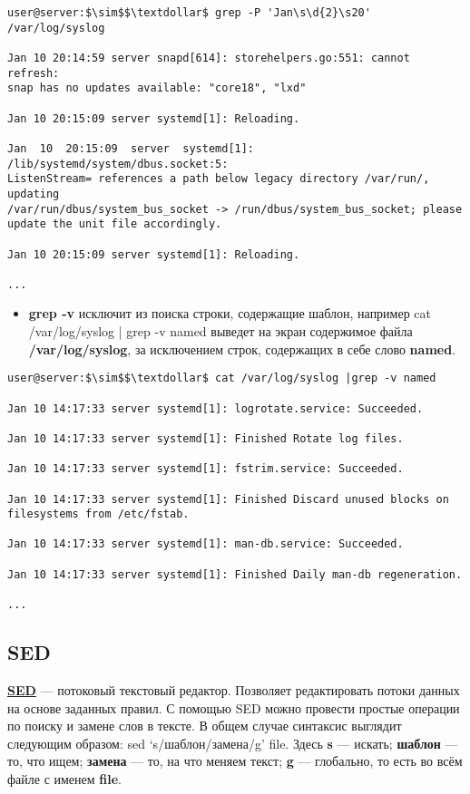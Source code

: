 \documentclass[14pt, a4paper]{article}
\begin{document}
\begin{lstlisting}
user@server:$\sim$$\textdollar$ grep -P 'Jan\s\d{2}\s20' /var/log/syslog

Jan 10 20:14:59 server snapd[614]: storehelpers.go:551: cannot refresh: 
snap has no updates available: "core18", "lxd"

Jan 10 20:15:09 server systemd[1]: Reloading.

Jan  10  20:15:09  server  systemd[1]:  /lib/systemd/system/dbus.socket:5:
ListenStream= references a path below legacy directory /var/run/, updating
/var/run/dbus/system_bus_socket -> /run/dbus/system_bus_socket; please 
update the unit file accordingly.

Jan 10 20:15:09 server systemd[1]: Reloading.

...
\end{lstlisting}

\begin{itemize}
    \item \textbf{grep -v} исключит из поиска строки, содержащие шаблон, например \colorbox{backcolour}{cat /var/log/syslog
    | grep -v} named выведет на экран содержимое файла \textbf{/var/log/syslog}, за исключением строк,
    содержащих в себе слово \textbf{named}.
\end{itemize}

\begin{lstlisting}
user@server:$\sim$$\textdollar$ cat /var/log/syslog |grep -v named

Jan 10 14:17:33 server systemd[1]: logrotate.service: Succeeded.

Jan 10 14:17:33 server systemd[1]: Finished Rotate log files.

Jan 10 14:17:33 server systemd[1]: fstrim.service: Succeeded.

Jan 10 14:17:33 server systemd[1]: Finished Discard unused blocks on 
filesystems from /etc/fstab.

Jan 10 14:17:33 server systemd[1]: man-db.service: Succeeded.

Jan 10 14:17:33 server systemd[1]: Finished Daily man-db regeneration.

...
\end{lstlisting}

\subsection*{SED} 

\href{https://habr.com/ru/company/ruvds/blog/327530/}{\textbf{SED}} — потоковый текстовый редактор. Позволяет редактировать потоки данных на основе заданных
правил. С помощью SED можно провести простые операции по поиску и замене слов в тексте. В
общем случае синтаксис выглядит следующим образом:\colorbox{backcolour}{ sed ‘s/шаблон/замена/g’ file}. Здесь \textbf{s}
— искать; \textbf{шаблон} — то, что ищем; \textbf{замена} — то, на что меняем текст; \textbf{g} — глобально, то есть во всём
файле с именем \textbf{file}.\\
\end{document}
